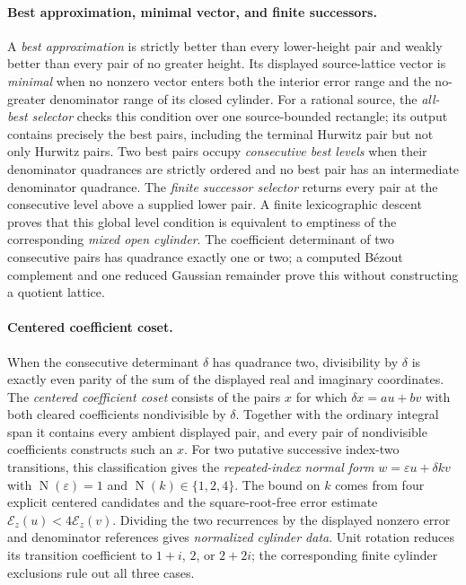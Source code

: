 \documentclass[11pt]{article}
\newcommand{\Norm}[1]{\operatorname{N}\!\left(#1\right)}
\begin{document}
\paragraph{Best approximation, minimal vector, and finite successors.}
A \emph{best approximation} is strictly better than every lower-height pair
and weakly better than every pair of no greater height.  Its displayed
source-lattice vector is \emph{minimal} when no nonzero vector enters both
the interior error range and the no-greater denominator range of its closed
cylinder.  For a rational source, the \emph{all-best selector} checks this
condition over one source-bounded rectangle; its output contains precisely
the best pairs, including the terminal Hurwitz pair but not only Hurwitz
pairs.  Two best pairs occupy \emph{consecutive best levels} when their
denominator quadrances are strictly ordered and no best pair has an
intermediate denominator quadrance.  The \emph{finite successor selector}
returns every pair at the consecutive level above a supplied lower pair.  A
finite lexicographic descent proves that this global level condition is
equivalent to emptiness of the corresponding \emph{mixed open cylinder}.
The coefficient determinant of two consecutive pairs has quadrance exactly
one or two; a computed B\'ezout complement and one reduced Gaussian remainder
prove this without constructing a quotient lattice.

\paragraph{Centered coefficient coset.}
When the consecutive determinant $\delta$ has quadrance two, divisibility by
$\delta$ is exactly even parity of the sum of the displayed real and
imaginary coordinates.  The \emph{centered coefficient coset} consists of
the pairs $x$ for which
$\delta x=a u+bv$ with both cleared coefficients nondivisible by $\delta$.
Together with the ordinary integral span it contains every ambient displayed
pair, and every pair of nondivisible coefficients constructs such an $x$.
For two putative successive index-two transitions, this classification gives
the \emph{repeated-index normal form}
$w=\varepsilon u+\delta k v$ with $\Norm\varepsilon=1$ and
$\Norm k\in\{1,2,4\}$.  The bound on $k$ comes from four explicit centered
candidates and the square-root-free error estimate
$\mathcal E_z(u)<4\mathcal E_z(v)$.  Dividing the two recurrences by the
displayed nonzero error and denominator references gives \emph{normalized
cylinder data}.  Unit rotation reduces its transition coefficient to
$1+i$, $2$, or $2+2i$; the corresponding finite cylinder exclusions rule
out all three cases.
\end{document}
